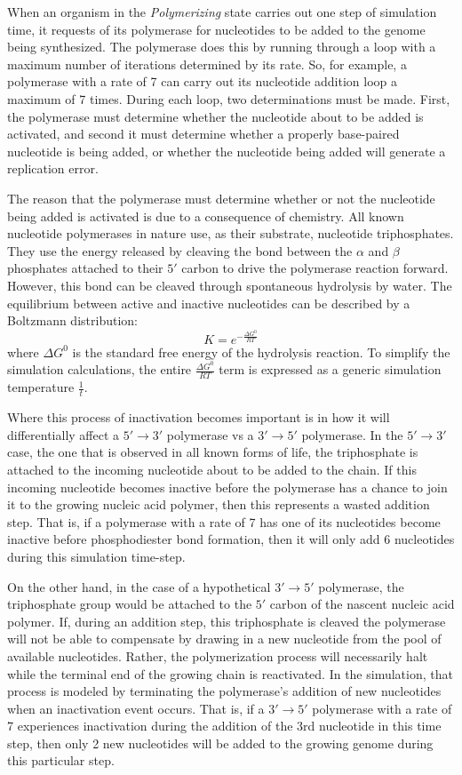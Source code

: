 When an organism in the \emph{Polymerizing} state carries out one step of simulation time, it requests of its polymerase for nucleotides to be added to the genome being synthesized. The polymerase does this by running through a loop with a maximum number of iterations determined by its rate. So, for example, a polymerase with a rate of 7 can carry out its nucleotide addition loop a maximum of 7 times. During each loop, two determinations must be made. First, the polymerase must determine whether the nucleotide about to be added is activated, and second it must determine whether a properly base-paired nucleotide is being added, or whether the nucleotide being added will generate a replication error.

The reason that the polymerase must determine whether or not the nucleotide being added is activated is due to a consequence of chemistry. All known nucleotide polymerases in nature use, as their substrate, nucleotide triphosphates. They use the energy released by cleaving the bond between the $\alpha$ and $\beta$ phosphates attached to their $5'$ carbon to drive the polymerase reaction forward. However, this bond can be cleaved through spontaneous hydrolysis by water. The equilibrium between active and inactive nucleotides can be described by a Boltzmann distribution:\[
	K = e^{-\frac{\Delta G^0}{RT}}
\]
where $\Delta G^0$ is the standard free energy of the hydrolysis reaction. To simplify the simulation calculations, the entire $\frac{\Delta G^0}{RT}$ term is expressed as a generic simulation temperature $\frac{1}{t}$.

Where this process of inactivation becomes important is in how it will differentially affect a $5'\to3'$ polymerase vs a $3'\to5'$ polymerase. In the $5'\to3'$ case, the one that is observed in all known forms of life, the triphosphate is attached to the incoming nucleotide about to be added to the chain. If this incoming nucleotide becomes inactive before the polymerase has a chance to join it to the growing nucleic acid polymer, then this represents a wasted addition step. That is, if a polymerase with a rate of 7 has one of its nucleotides become inactive before phosphodiester bond formation, then it will only add 6 nucleotides during this simulation time-step.

On the other hand, in the case of a hypothetical $3'\to5'$ polymerase, the triphosphate group would be attached to the $5'$ carbon of the nascent nucleic acid polymer. If, during an addition step, this triphosphate is cleaved the polymerase will not be able to compensate by drawing in a new nucleotide from the pool of available nucleotides. Rather, the polymerization process will necessarily halt while the terminal end of the growing chain is reactivated. In the simulation, that process is modeled by terminating the polymerase's addition of new nucleotides when an inactivation event occurs. That is, if a $3'\to5'$ polymerase with a rate of 7 experiences inactivation during the addition of the 3rd nucleotide in this time step, then only 2 new nucleotides will be added to the growing genome during this particular step.

